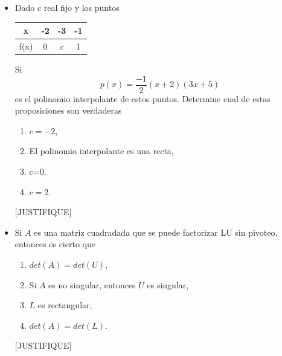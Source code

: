 \documentclass[11pt]{article}
\newcommand{\buena}{[BUENA]}
\newcommand{\justifique}{[JUSTIFIQUE]}
\newcommand{\nojustifique}{[NOJUSTIFIQUE]}
\begin{document}
\begin{itemize}

\item Dado $c$ real fijo y los puntos
\begin{center}
\begin{tabular}{c|ccc}
x		& -2 & -3 & -1   \\
\hline
f(x)	& 0  & $c$  & 1 \\
\end{tabular}
\end{center}
Si 
$$
p(x)=\frac{-1}{2}(x+2)(3x+5)
$$
es el polinomio interpolante de estos puntos. Determine cual de estas proposiciones son verdaderas
\begin{enumerate} 
\item\buena $c=-2$,
\item El polinomio interpolante es una recta,
\item c=0.
\item $c=2$.
\end{enumerate}
\justifique 

\item Si $A$ es una matriz cuadradada que se puede factorizar LU sin pivoteo, entonces es cierto que 
\begin{enumerate} 
\item \buena $det(A)=det(U)$,
\item Si $A$ es no singular, entonces $U$ es singular,
\item $L$ es rectangular,
\item $det(A)=det(L)$.
\end{enumerate}
\justifique 


\end{itemize}
\end{document}
